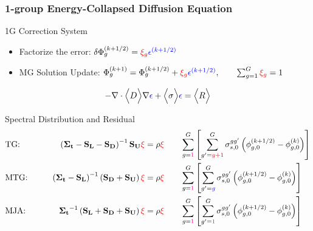\documentclass[compress,10pt]{beamer}
\renewcommand{\vec}[1]{\mathbf{#1}}
\newcommand{\tcr}[1]{\textcolor{red}{#1}}
\newcommand{\tcb}[1]{\textcolor{blue}{#1}}
\newcommand{\tcm}[1]{\textcolor{magenta}{#1}}
\begin{document}
\begin{frame}[t]\frametitle{1-group Energy-Collapsed Diffusion Equation}
\begin{block}{1G Correction System}{\footnotesize
\begin{itemize}
\item Factorize the error: $\delta \Phi_{g}^{(k+1/2)} = \tcr{\xi_g} \tcb{\epsilon^{(k+1/2)}}$
\item MG Solution Update:  $ \Phi_{g}^{(k+1)} =  \Phi_{g}^{(k+1/2)} + \tcr{\xi_g} \tcb{\epsilon^{(k+1/2)}}, \qquad \sum\displaylimits_{g=1}^{G} \tcr{\xi_g} = 1 $ 
\end{itemize}
\vspace{3mm}
\begin{equation*}
-\vec{\nabla} \cdot \Big< D \Big> \vec{\nabla} \tcb{\epsilon} + \Big< \sigma \Big> \tcb{\epsilon} = \Big< R \Big>
\end{equation*}
}\end{block}
\begin{block}{Spectral Distribution and Residual}{\footnotesize
\begin{equation*}
\begin{aligned}
&\text{TG:} \qquad    & \left(  {\bf \Sigma_t} - {\bf S_{L}} - {\bf S_{D}} \right)^{-1} {\bf S_{U}} {\bf \tcr{\xi}} = \rho {\bf \tcr{\xi}} \qquad &\sum\limits_{g=\tcm{1}}^G \left[ \sum\limits_{g'=\tcr{g+1}}^G \sigma_{s,0}^{gg'} \left( \phi_{g,0}^{(k+1/2)} - \phi_{g,0}^{(k)}  \right)\right]\\
&\text{MTG:} \qquad & \left(  {\bf \Sigma_t} - {\bf S_{L}}  \right)^{-1} \left( {\bf S_{D}} + {\bf S_{U}} \right) {\bf \tcr{\xi}} = \rho {\bf \tcr{\xi}} \qquad &\sum\limits_{g=\tcm{1}}^G \left[ \sum\limits_{g'=\tcb{g}}^G \sigma_{s,0}^{gg'} \left( \phi_{g,0}^{(k+1/2)} - \phi_{g,0}^{(k)}  \right)\right]\\
&\text{MJA:} \qquad & {\bf \Sigma_t}^{-1} \left( {\bf S_L} + {\bf S_D} +{\bf S_U} \right) {\bf \tcr{\xi}} = \rho {\bf \tcr{\xi}} \qquad &\sum\limits_{g=\tcm{1}}^G \left[ \sum\limits_{g'=\tcm{1}}^G \sigma_{s,0}^{gg'} \left( \phi_{g,0}^{(k+1/2)} - \phi_{g,0}^{(k)}  \right)\right]\\
\end{aligned}
\end{equation*}
}\end{block}
\end{frame}
\end{document}
